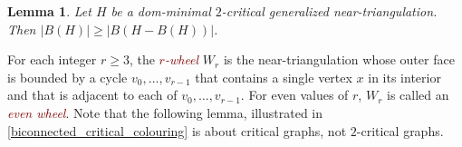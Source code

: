 \documentclass[a4paper,UKenglish, cleveref, autoref, thm-restate]{lipics-v2021}
\newtheorem{lem}{Lemma}
\newcommand{\defin}[1]{\emph{\textcolor{Maroon}{#1}}}
\begin{document}
\begin{lem}\label{two_critical_boundary_size}
  Let $H$ be a dom-minimal $2$-critical generalized near-triangulation.  Then $|B(H)|\ge |B(H-B(H))|$.
\end{lem}


For each integer $r\ge 3$, the \defin{$r$-wheel} $W_r$ is the near-triangulation whose outer face is bounded by a cycle $v_0,\ldots,v_{r-1}$ that contains a single vertex $x$ in its interior and that is adjacent to each of $v_0,\ldots,v_{r-1}$.  For even values of $r$, $W_r$ is called an \defin{even wheel}. Note that the following lemma, illustrated in \cref{biconnected_critical_colouring} is about critical graphs, not $2$-critical graphs.
\end{document}
